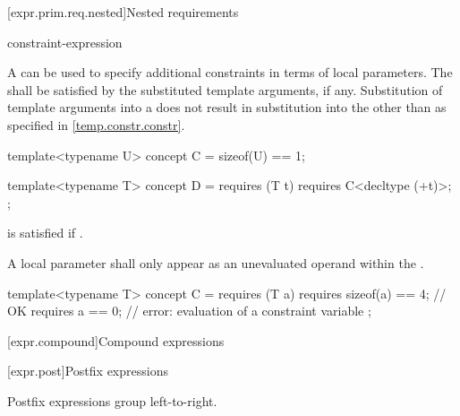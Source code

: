 [expr.prim.req.nested]{Nested requirements}
%

\begin{bnf}
\br
     constraint-expression \terminal{;}
\end{bnf}

\pnum
A  can be used
to specify additional constraints in terms of local parameters.
The 
shall be satisfied
by the substituted template arguments, if any.
Substitution of template arguments into a 
does not result in substitution into the 
other than as specified in \ref{temp.constr.constr}.
\begin{example}
\begin{codeblock}
template<typename U> concept C = sizeof(U) == 1;

template<typename T> concept D = requires (T t) {
  requires C<decltype (+t)>;
};
\end{codeblock}
 is satisfied if .
\end{example}

\pnum
A local parameter shall only appear as an unevaluated operand
within the .
\begin{example}
\begin{codeblock}
template<typename T> concept C = requires (T a) {
  requires sizeof(a) == 4;      // OK
  requires a == 0;              // error: evaluation of a constraint variable
};
\end{codeblock}
\end{example}

[expr.compound]{Compound expressions}

[expr.post]{Postfix expressions}%

\pnum
Postfix expressions group left-to-right.

